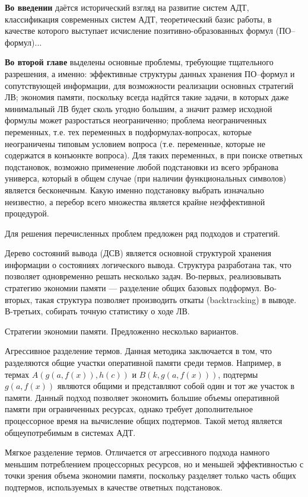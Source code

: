 \documentclass[a4paper]{report}
\begin{document}
\textbf{Во введении} даётся исторический взгляд на развитие систем АДТ, классификация современных систем АДТ, теоретический базис работы, в качестве которого выступает исчисление позитивно-образованных формул (ПО--формул)...


\textbf{Во второй главе} выделены основные проблемы, требующие тщательного разрешения, а именно: эффективные структуры данных хранения ПО--формул и сопутствующей информации, для возможности реализации основных стратегий ЛВ; экономия памяти, поскольку всегда надйтся такие задачи, в которых даже минимальный ЛВ будет сколь угодно большим, а значит размер исходной формулы может разростаться неограниченно; проблема неограниченных переменных, т.е. тех переменных в подформулах-вопросах, которые неограничены типовым условием вопроса (т.е. переменные, которые не содержатся в конъюнкте вопроса). Для таких переменных, в при поиске ответных подстановок, возможно применение любой подстановки из всего эрбранова универса, который в общем случае (при наличии функциональных символов) является бесконечным. Какую именно подстановку выбрать изначально неизвестно, а перебор всего множества является крайне неэффективной процедурой. 

Для решения перечисленных проблем предложен ряд подходов и стратегий. 

Дерево состояний вывода (ДСВ) является основной структурой хранения информации о состояниях логического вывода. Структура разработана так, что позволяет одновременно решать несколько задач. Во-первых, реализовывать стратегию экономии памяти --- разделение общих базовых подформул. Во-вторых, такая структура позволяет производить откаты (backtracking) в выводе. В-третьих, собирать точную статистику о ходе ЛВ.

Стратегии экономии памяти. Предложенно несколько вариантов. 

Агрессивное разделение термов. Данная методика заключается в том, что разделяются общие участки оперативной памяти среди термов. Например, в термах $A(g(a,f(x)),h(c))$ и $B(k,g(a,f(x)))$, подтермы $g(a,f(x))$ являются общими и представляют собой один и тот же участок в памяти. Данный подход позволяет экономить большие объемы оперативной памяти при ограниченных ресурсах, однако требует дополнительное процессорное время на вычисление общих подтермов. Такой метод является общеупотребимым в системах АДТ. 

Мягкое разделение термов. Отличается от агрессивного подхода намного меньшим потреблением процессорных ресурсов, но и меньшей эффективностью с точки зрения объема экономии памяти, поскольку разделяет только часть общих подтермов, используемых в качестве ответных подстановок.
\end{document}
